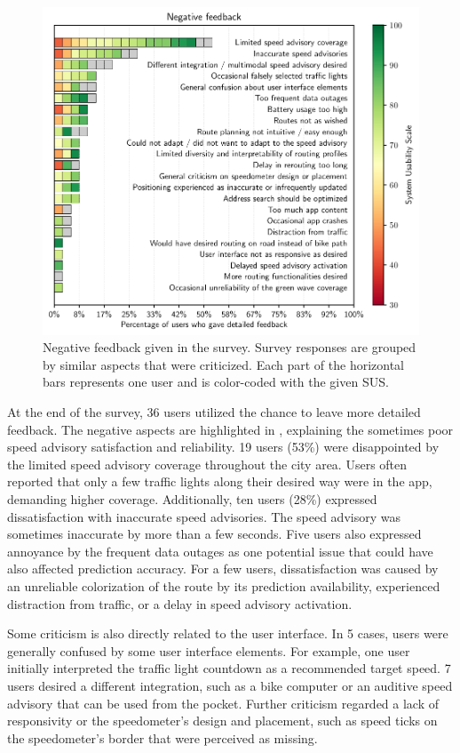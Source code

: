 \begin{figure}[t]
\caption{Negative feedback given in the survey. Survey responses are grouped by similar aspects that were criticized. Each part of the horizontal bars represents one user and is color-coded with the given SUS.}\label{fig:app-negative-feedback}
\includegraphics[width=\linewidth]{images/app-feedback-negative.pdf}
\end{figure}

At the end of the survey, 36 users utilized the chance to leave more detailed feedback. The negative aspects are highlighted in , explaining the sometimes poor speed advisory satisfaction and reliability. 19 users (53\%) were disappointed by the limited speed advisory coverage throughout the city area. Users often reported that only a few traffic lights along their desired way were in the app, demanding higher coverage. Additionally, ten users (28\%) expressed dissatisfaction with inaccurate speed advisories. The speed advisory was sometimes inaccurate by more than a few seconds. Five users also expressed annoyance by the frequent data outages as one potential issue that could have also affected prediction accuracy. For a few users, dissatisfaction was caused by an unreliable colorization of the route by its prediction availability, experienced distraction from traffic, or a delay in speed advisory activation.

Some criticism is also directly related to the user interface. In 5 cases, users were generally confused by some user interface elements. For example, one user initially interpreted the traffic light countdown as a recommended target speed. 7 users desired a different integration, such as a bike computer or an auditive speed advisory that can be used from the pocket. Further criticism regarded a lack of responsivity or the speedometer's design and placement, such as speed ticks on the speedometer's border that were perceived as missing.


